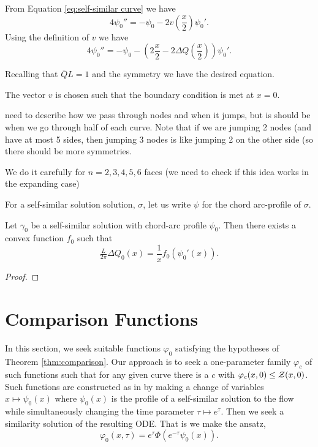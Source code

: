\documentclass[11pt]{amsart}
\begin{document}
From Equation \eqref{eq:self-similar curve} we have
$$4\psi_0''=-\psi_0-2v\left(\frac{x}{2}\right) \psi_0'. $$
Using the definition of $v$ we have
$$4\psi_0''=-\psi_0-\left(2\frac{x}{2}-2\Delta Q(\frac{x}{2})\right) \psi_0'. $$

Recalling that $\bar{Q}{L}=1$ and the symmetry we have the desired equation. 


The vector $v$ is chosen such that the boundary condition is met at $x=0$.

{\color{red} need to describe how we pass through nodes and when it jumps, but is should be when we go through half of each curve. Note that if we are jumping 2 nodes (and have at most 5 sides, then jumping 3 nodes is like jumping 2 on the other side (so there should be more symmetries. }

We do it carefully for $n=2,3,4,5, 6$ faces (we need to check if this idea works in the expanding case)

For a self-similar solution solution, \(\sigma\), let us write \(\psi\) for the chord arc-profile of \(\sigma\).

\begin{lemma}
Let \(\gamma_0\) be a self-similar solution with chord-arc profile $\psi_0$. Then there exists a convex function $f_0$ such that
\[
\tfrac{L}{2\pi} \Delta Q_0 (x) = \frac{1}{x} f_0(\psi_0'(x)).
\]
\end{lemma}

\begin{proof}

\end{proof}

\section{Comparison Functions}
\label{sec:orgheadline11}

In this section, we seek suitable functions $\varphi_0$ satisfying the hypotheses of Theorem \ref{thm:comparison}. Our approach is to seek a one-parameter family $\varphi_c$ of such functions such that for any given curve there is a $c$ with $\varphi_c(x, 0) \leq \operatorname{\mathcal{Z}}(x, 0)$. Such functions are constructed as in \cite{MR2794630} by making a change of variables $x \mapsto \psi_0(x)$ where $\psi_0(x)$ is the profile of a self-similar solution to the flow while simultaneously changing the time parameter $\tau \mapsto e^{\tau}$. Then we seek a similarity solution of the resulting ODE. That is we make the ansatz,
\[
\varphi_0(x, \tau) = e^{\tau} \Phi(e^{-\tau} \psi_0(x)).
\]
\end{document}
